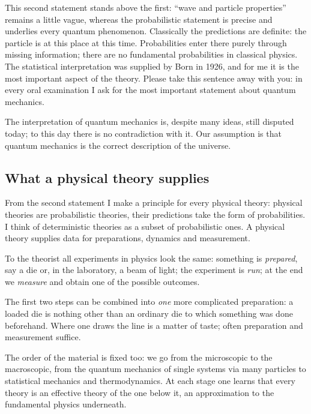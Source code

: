 This second statement stands above the first: ``wave and particle properties'' remains a little vague, whereas the probabilistic statement is precise and underlies every quantum phenomenon. Classically the predictions are definite: the particle is at this place at this time. Probabilities enter there purely through missing information; there are no fundamental probabilities in classical physics. The statistical interpretation was supplied by Born in 1926, and for me it is the most important aspect of the theory. Please take this sentence away with you: in every oral examination I ask for the most important statement about quantum mechanics.

The interpretation of quantum mechanics is, despite many ideas, still disputed today; to this day there is no contradiction with it. Our assumption is that quantum mechanics is the correct description of the universe.

\subsection{What a physical theory supplies}
From the second statement I make a principle for every physical theory: physical theories are probabilistic theories, their predictions take the form of probabilities. I think of deterministic theories as a subset of probabilistic ones. A physical theory supplies data for preparations, dynamics and measurement.

\begin{greybox}
To the theorist all experiments in physics look the same: something is \emph{prepared}, say a die or, in the laboratory, a beam of light; the experiment is \emph{run}; at the end we \emph{measure} and obtain one of the possible outcomes.

The first two steps can be combined into \emph{one} more complicated preparation: a loaded die is nothing other than an ordinary die to which something was done beforehand. Where one draws the line is a matter of taste; often preparation and measurement suffice.
\end{greybox}

The order of the material is fixed too: we go from the microscopic to the macroscopic, from the quantum mechanics of single systems via many particles to statistical mechanics and thermodynamics. At each stage one learns that every theory is an effective theory of the one below it, an approximation to the fundamental physics underneath.

